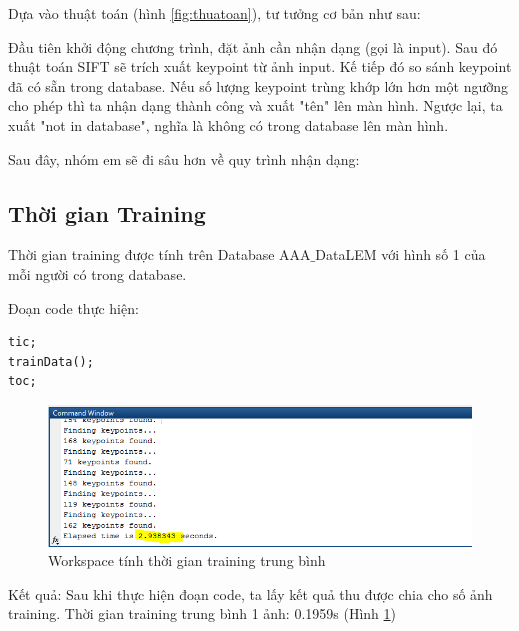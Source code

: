 \documentclass[conference]{IEEEtran}
\begin{document}
Dựa vào thuật toán (hình \ref{fig:thuatoan}), tư tưởng cơ bản như sau:

Đầu tiên khởi động chương trình, đặt ảnh cần nhận dạng (gọi là input). Sau đó thuật toán SIFT sẽ trích xuất keypoint từ ảnh input. Kế tiếp đó so sánh keypoint đã có sẵn trong database. Nếu số lượng keypoint trùng khớp lớn hơn một ngưỡng cho phép thì ta nhận dạng thành công và xuất "tên" lên màn hình. Ngược lại, ta xuất "not in database", nghĩa là không có trong database lên màn hình.

Sau đây, nhóm em sẽ đi sâu hơn về quy trình nhận dạng:

\subsection{Thời gian Training}
Thời gian training được tính trên Database AAA$\_$DataLEM với hình số 1 của mỗi người có trong database.

    Đoạn code thực hiện:
    
\begin{lstlisting}
tic;
trainData();
toc;
\end{lstlisting} 

\begin{figure}
  \includegraphics[width=\linewidth]{ketqua1_tinh}
  \caption{Workspace tính thời gian training trung bình}
  \label{fig:ketqua1_tinh}
\end{figure}      
    Kết  quả:
   Sau khi thực hiện đoạn code, ta lấy kết quả thu được chia cho số ảnh training.
   Thời gian training trung bình 1 ảnh: 0.1959s (Hình \ref{fig:ketqua1_tinh})
\end{document}
